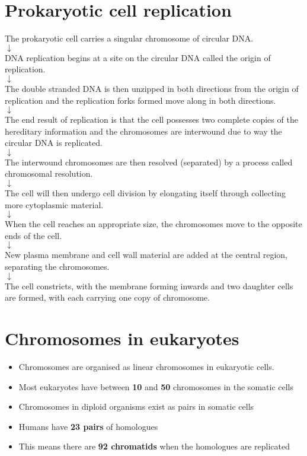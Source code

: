 \documentclass[11pt]{article}
\begin{document}
\section{Prokaryotic cell replication}
\label{sec:org64c40aa}
\begin{center}
The prokaryotic cell carries a singular chromosome of circular DNA. \\
$\downarrow$ \\
DNA replication begins at a site on the circular DNA called the origin of replication. \\
$\downarrow$ \\
The double stranded DNA is then unzipped in both directions from the origin of replication and the replication forks formed move along in both directions. \\
$\downarrow$ \\
The end result of replication is that the cell possesses two complete copies of the hereditary information and the chromosomes are interwound due to way the circular DNA is replicated. \\
$\downarrow$ \\
The interwound chromosomes are then resolved (separated) by a process called chromosomal resolution. \\
$\downarrow$ \\
The cell will then undergo cell division by elongating itself through collecting more cytoplasmic material. \\
$\downarrow$ \\
When the cell reaches an appropriate size, the chromosomes move to the opposite ends of the cell. \\
$\downarrow$ \\
New plasma membrane and cell wall material are added at the central region, separating the chromosomes. \\
$\downarrow$ \\
The cell constricts, with the membrane forming inwards and two daughter cells are formed, with each carrying one copy of chromosome.
\end{center}

\newpage

\section{Chromosomes in eukaryotes}
\label{sec:org3a67dc0}
\begin{itemize}
\item Chromosomes are organised as linear chromosomes in eukaryotic cells.
\item Most eukaryotes have between \textbf{10} and \textbf{50} chromosomes in the somatic cells
\item Chromosomes in diploid organisms exist as pairs in somatic cells
\item Humans have \textbf{23 pairs} of homologues
\item This means there are \textbf{92 chromatids} when the homologues are replicated
\end{itemize}
\end{document}
